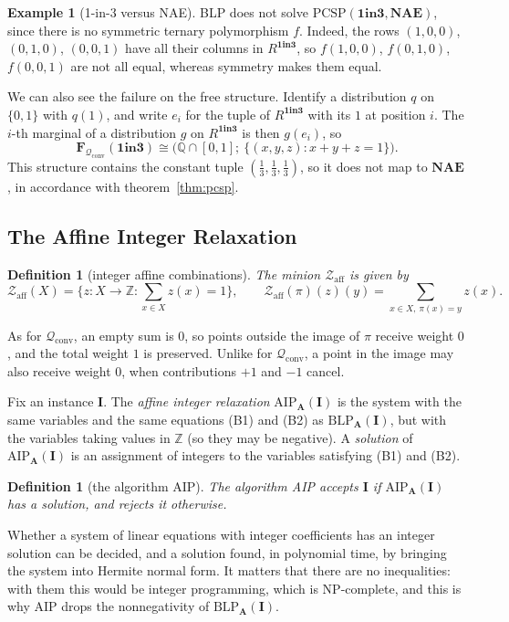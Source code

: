 \documentclass[11pt]{article}
\theoremstyle{plain}
\newtheorem{definition}[theorem]{Definition}
\theoremstyle{definition}
\newtheorem{example}[theorem]{Example}
\newcommand{\bA}{\mathbf{A}}
\newcommand{\bI}{\mathbf{I}}
\newcommand{\bF}{\mathbf{F}}
\newcommand{\Q}{\mathbb{Q}}
\newcommand{\Z}{\mathbb{Z}}
\newcommand{\Qc}{\mathscr{Q}_{\mathrm{conv}}}
\newcommand{\Za}{\mathscr{Z}_{\mathrm{aff}}}
\newcommand{\OIT}{\mathbf{1in3}}
\newcommand{\NAE}{\mathbf{NAE}}
\newcommand{\PCSP}{\mathrm{PCSP}}
\newcommand{\BLP}{\mathrm{BLP}}
\newcommand{\AIP}{\mathrm{AIP}}
\begin{document}
\begin{example}[1-in-3 versus NAE]\label{ex:1in3-blp}
BLP does not solve $\PCSP(\OIT,\NAE)$, since there is no symmetric ternary polymorphism $f$. Indeed, the rows $(1,0,0)$, $(0,1,0)$, $(0,0,1)$ have all their columns in $R^{\OIT}$, so $f(1,0,0)$, $f(0,1,0)$, $f(0,0,1)$ are not all equal, whereas symmetry makes them equal.

We can also see the failure on the free structure. Identify a distribution $q$ on $\{0,1\}$ with $q(1)$, and write $e_i$ for the tuple of $R^{\OIT}$ with its $1$ at position $i$. The $i$-th marginal of a distribution $g$ on $R^{\OIT}$ is then $g(e_i)$, so
\[
\bF_{\Qc}(\OIT)\cong\big(\Q\cap[0,1];\ \{(x,y,z) : x+y+z=1\}\big).
\]
This structure contains the constant tuple $(\tfrac13,\tfrac13,\tfrac13)$, so it does not map to $\NAE$, in accordance with theorem~\ref{thm:pcsp}.
\end{example}

\subsection{The Affine Integer Relaxation}\label{sec:aip}

\begin{definition}[integer affine combinations]
The minion $\Za$ is given by
\[
\Za(X)=\Big\{z\colon X\to\Z : \sum_{x\in X}z(x)=1\Big\},\qquad\Za(\pi)(z)(y)=\sum_{x\in X,\ \pi(x)=y}z(x).
\]
\end{definition}

As for $\Qc$, an empty sum is $0$, so points outside the image of $\pi$ receive weight $0$, and the total weight $1$ is preserved. Unlike for $\Qc$, a point in the image may also receive weight $0$, when contributions $+1$ and $-1$ cancel.

Fix an instance $\bI$. The \emph{affine integer relaxation} $\AIP_{\bA}(\bI)$ is the system with the same variables and the same equations (B1) and (B2) as $\BLP_{\bA}(\bI)$, but with the variables taking values in $\Z$ (so they may be negative). A \emph{solution} of $\AIP_{\bA}(\bI)$ is an assignment of integers to the variables satisfying (B1) and (B2).

\begin{definition}[the algorithm AIP]
The algorithm \emph{AIP} accepts $\bI$ if $\AIP_{\bA}(\bI)$ has a solution, and rejects it otherwise.
\end{definition}

Whether a system of linear equations with integer coefficients has an integer solution can be decided, and a solution found, in polynomial time, by bringing the system into Hermite normal form. It matters that there are no inequalities: with them this would be integer programming, which is NP-complete, and this is why AIP drops the nonnegativity of $\BLP_{\bA}(\bI)$.
\end{document}
